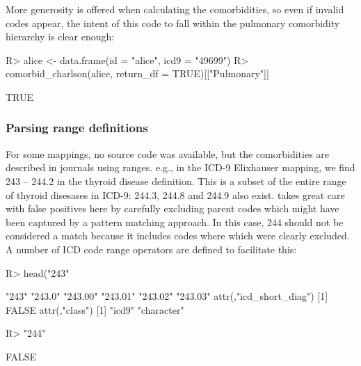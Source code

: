 \documentclass[article]{jss}
\begin{document}
More generosity is offered when calculating the comorbidities, so even
if invalid codes appear, the intent of this code to fall within the
pulmonary comorbidity hierarchy is clear enough:

\begin{CodeChunk}

\begin{CodeInput}
R> alice <- data.frame(id = "alice", icd9 = "49699")
R> comorbid_charlson(alice, return_df = TRUE)[["Pulmonary"]]
\end{CodeInput}

\begin{CodeOutput}
[1] TRUE
\end{CodeOutput}
\end{CodeChunk}

\subsubsection{Parsing range
definitions}\label{parsing-range-definitions}

For some mappings, no source code was available, but the comorbidities
are described in journals using ranges. e.g., in the ICD-9 Elixhauser
mapping, we find 243 -- 244.2 in the thyroid disease definition. This is
a subset of the entire range of thyroid disesases in ICD-9: 244.3, 244.8
and 244.9 also exist.  takes great care with false positives
here by carefully excluding parent codes which might have been captured
by a pattern matching approach. In this case, 244 should not be
considered a match because it includes codes where which were clearly
excluded. A number of ICD code range operators are defined to facilitate
this:

\begin{CodeChunk}

\begin{CodeInput}
R> head("243" %
\end{CodeInput}

\begin{CodeOutput}
[1] "243"    "243.0"  "243.00" "243.01" "243.02" "243.03"
attr(,"icd_short_diag")
[1] FALSE
attr(,"class")
[1] "icd9"      "character"
\end{CodeOutput}

\begin{CodeInput}
R> "244" %
\end{CodeInput}

\begin{CodeOutput}
[1] FALSE
\end{CodeOutput}
\end{CodeChunk}
\end{document}
